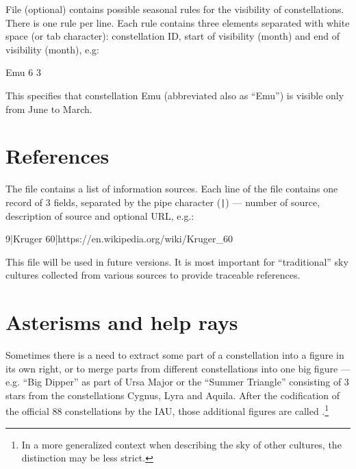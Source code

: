 File  (optional) contains possible seasonal rules for
the visibility of constellations. There is one rule per line. Each
rule contains three elements separated with white space (or tab
character): constellation ID, start of visibility (month) and end of
visibility (month), e.g:

\begin{configfile}
  Emu 6 3
\end{configfile}

\noindent This specifies that constellation Emu (abbreviated also as ``Emu'') is
visible only from June to March.

\section{References}
\label{sec:skycultures:references}

\noindent{}The file  contains a list of information sources. 
Each line of the file contains one record of 3 fields,
separated by the pipe character (\texttt{|}) --- number of source, 
description of source and optional URL, e.g.:

\begin{configfile}
9|Kruger 60|https://en.wikipedia.org/wiki/Kruger_60
\end{configfile}

This file will be used in future versions. It is most important for ``traditional'' 
sky cultures collected from various sources to provide traceable references. 

\section{Asterisms and help rays}
\label{sec:skycultures:asterisms}

\noindent{}Sometimes there is a need to extract some part of a 
constellation into a figure in its own right, or to merge parts from different 
constellations into one big figure --- e.g. ``Big Dipper'' as part of Ursa Major or the 
``Summer Triangle'' consisting of 3 stars from the constellations Cygnus, Lyra and Aquila. 
After the codification of the official 88 constellations by the IAU, those additional figures
are called .\footnote{In a more generalized context when describing the sky of
  other cultures, the distinction may be less strict.}

